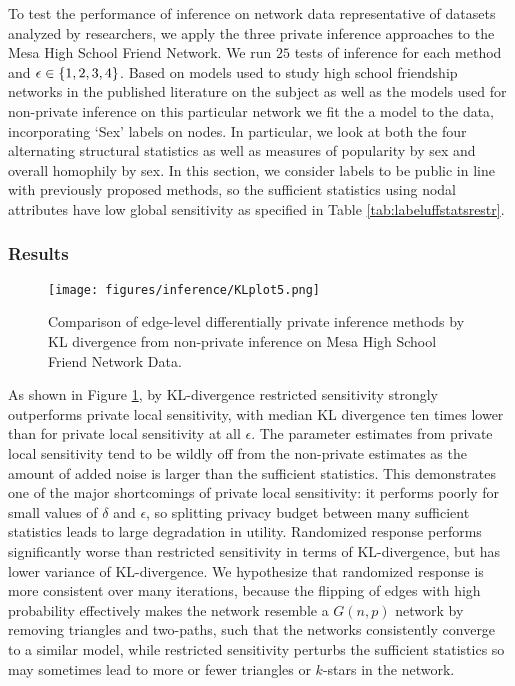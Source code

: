  To test the performance of inference on network data representative of datasets analyzed by researchers, we apply the three private inference approaches to the Mesa High School Friend Network. We run $25$ tests of inference for each method and $\epsilon \in \{1,2,3,4\}$. Based on models used to study high school friendship networks in the published literature on the subject \cite{GKM09} as well as the models used for non-private inference on this particular network \cite{ergm} we fit the a model to the data, incorporating `Sex' labels on nodes. In particular, we look at both the four alternating structural statistics as well as measures of popularity by sex and overall homophily by sex. In this section, we consider labels to be public in line with previously proposed methods, so the sufficient statistics using nodal attributes have low global sensitivity as specified in Table \ref{tab:labeluffstatsrestr}.
 
  \subsubsection{Results}
  
   \begin{figure}[h]
  	\caption{Comparison of edge-level differentially private inference methods by KL divergence from non-private inference on Mesa High School Friend Network Data.}
  	\centering
  	\texttt{[image: figures/inference/KLplot5.png]}
  	\label{fig:kledgepub}
  \end{figure}
  
  As shown in Figure \ref{fig:kledgepub}, by KL-divergence restricted sensitivity strongly outperforms private local sensitivity, with median KL divergence ten times lower than for private local sensitivity at all $\epsilon$. The parameter estimates from private local sensitivity tend to be wildly off from the non-private estimates as the amount of added noise is larger than the sufficient statistics. This demonstrates one of the major shortcomings of private local sensitivity: it performs poorly for small values of $\delta$ and $\epsilon$, so splitting privacy budget between many sufficient statistics leads to large degradation in utility. Randomized response performs significantly worse than restricted sensitivity in terms of KL-divergence, but has lower variance of KL-divergence. We hypothesize that randomized response is more consistent over many iterations, because the flipping of edges with high probability effectively makes the network resemble a $G(n,p)$ network by removing triangles and two-paths, such that the networks consistently converge to a similar model, while restricted sensitivity perturbs the sufficient statistics so may sometimes lead to more or fewer triangles or $k$-stars in the network. 
  
